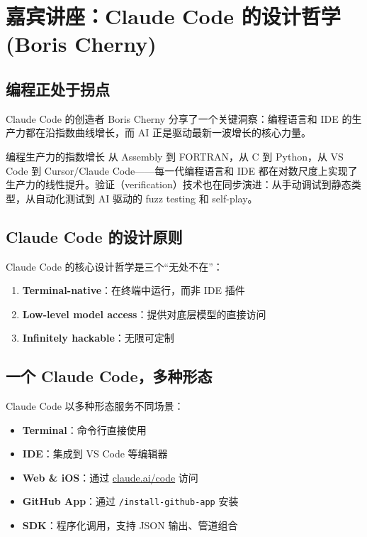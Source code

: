 \section{嘉宾讲座：Claude Code 的设计哲学 (Boris Cherny)}

\subsection{编程正处于拐点}

Claude Code 的创造者 Boris Cherny 分享了一个关键洞察：编程语言和 IDE 的生产力都在沿指数曲线增长，而 AI 正是驱动最新一波增长的核心力量。

\begin{knowledgebox}{编程生产力的指数增长}
从 Assembly 到 FORTRAN，从 C 到 Python，从 VS Code 到 Cursor/Claude Code——每一代编程语言和 IDE 都在对数尺度上实现了生产力的线性提升。验证（verification）技术也在同步演进：从手动调试到静态类型，从自动化测试到 AI 驱动的 fuzz testing 和 self-play。
\end{knowledgebox}

\subsection{Claude Code 的设计原则}

Claude Code 的核心设计哲学是三个``无处不在''：

\begin{enumerate}
    \item \textbf{Terminal-native}：在终端中运行，而非 IDE 插件
    \item \textbf{Low-level model access}：提供对底层模型的直接访问
    \item \textbf{Infinitely hackable}：无限可定制
\end{enumerate}

\subsection{一个 Claude Code，多种形态}

Claude Code 以多种形态服务不同场景：

\begin{itemize}
    \item \textbf{Terminal}：命令行直接使用
    \item \textbf{IDE}：集成到 VS Code 等编辑器
    \item \textbf{Web \& iOS}：通过 \url{claude.ai/code} 访问
    \item \textbf{GitHub App}：通过 \texttt{/install-github-app} 安装
    \item \textbf{SDK}：程序化调用，支持 JSON 输出、管道组合
\end{itemize}

